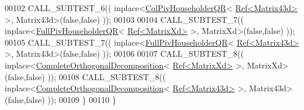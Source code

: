 \begin{DoxyCode}
00102     CALL\_SUBTEST\_6(( inplace<\hyperlink{group___q_r___module_class_eigen_1_1_col_piv_householder_q_r}{ColPivHouseholderQR}<
      \hyperlink{group___core___module_class_eigen_1_1_ref}{Ref<Matrix43d>} >, Matrix43d>(\textcolor{keyword}{false},\textcolor{keyword}{false}) ));
00103 
00104     CALL\_SUBTEST\_7(( inplace<\hyperlink{group___q_r___module_class_eigen_1_1_full_piv_householder_q_r}{FullPivHouseholderQR}<
      \hyperlink{group___core___module_class_eigen_1_1_ref}{Ref<MatrixXd>} >, MatrixXd>(\textcolor{keyword}{false},\textcolor{keyword}{false}) ));
00105     CALL\_SUBTEST\_7(( inplace<\hyperlink{group___q_r___module_class_eigen_1_1_full_piv_householder_q_r}{FullPivHouseholderQR}<
      \hyperlink{group___core___module_class_eigen_1_1_ref}{Ref<Matrix43d>} >, Matrix43d>(\textcolor{keyword}{false},\textcolor{keyword}{false}) ));
00106 
00107     CALL\_SUBTEST\_8(( inplace<\hyperlink{group___q_r___module_class_eigen_1_1_complete_orthogonal_decomposition}{CompleteOrthogonalDecomposition}<
      \hyperlink{group___core___module_class_eigen_1_1_ref}{Ref<MatrixXd>} >, MatrixXd>(\textcolor{keyword}{false},\textcolor{keyword}{false}) ));
00108     CALL\_SUBTEST\_8(( inplace<\hyperlink{group___q_r___module_class_eigen_1_1_complete_orthogonal_decomposition}{CompleteOrthogonalDecomposition}<
      \hyperlink{group___core___module_class_eigen_1_1_ref}{Ref<Matrix43d>} >, Matrix43d>(\textcolor{keyword}{false},\textcolor{keyword}{false}) ));
00109   \}
00110 \}
\end{DoxyCode}
